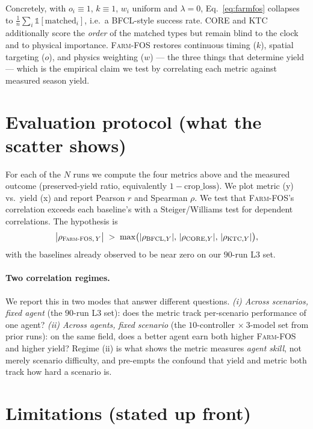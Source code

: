 \documentclass[11pt]{article}
\newcommand{\farmfos}{\textsc{Farm-FOS}}
\begin{document}
\noindent Concretely, with $o_i\equiv1$, $k\equiv1$, $w_i$ uniform and
$\lambda=0$, Eq.~\eqref{eq:farmfos} collapses to
$\tfrac1n\sum_i\mathbb{1}[\text{matched}_i]$, i.e.\ a BFCL-style success rate.
CORE and KTC additionally score the \emph{order} of the matched types but remain
blind to the clock and to physical importance. \farmfos{} restores continuous
timing ($k$), spatial targeting ($o$), and physics weighting ($w$) --- the three
things that determine yield --- which is the empirical claim we test by
correlating each metric against measured season yield.

\section{Evaluation protocol (what the scatter shows)}

For each of the $N$ runs we compute the four metrics above and the measured
outcome (preserved-yield ratio, equivalently $1-\text{crop\_loss}$). We plot
metric (y) vs.\ yield (x) and report Pearson $r$ and Spearman $\rho$. We test
that \farmfos's correlation exceeds each baseline's with a Steiger/Williams test
for dependent correlations. The hypothesis is
\[
\bigl|\rho_{\farmfos,\,Y}\bigr|\;>\;
\max\bigl(|\rho_{\mathrm{BFCL},Y}|,\,|\rho_{\mathrm{CORE},Y}|,\,|\rho_{\mathrm{KTC},Y}|\bigr),
\]
with the baselines already observed to be near zero on our $90$-run L3 set.

\paragraph{Two correlation regimes.} We report this in two modes that answer
different questions. \emph{(i) Across scenarios, fixed agent} (the $90$-run L3
set): does the metric track per-scenario performance of one agent? \emph{(ii)
Across agents, fixed scenario} (the $10$-controller $\times\ 3$-model set from
prior runs): on the same field, does a better agent earn both higher \farmfos{}
and higher yield? Regime (ii) is what shows the metric measures \emph{agent
skill}, not merely scenario difficulty, and pre-empts the confound that yield
and metric both track how hard a scenario is.

\section{Limitations (stated up front)}
\end{document}
